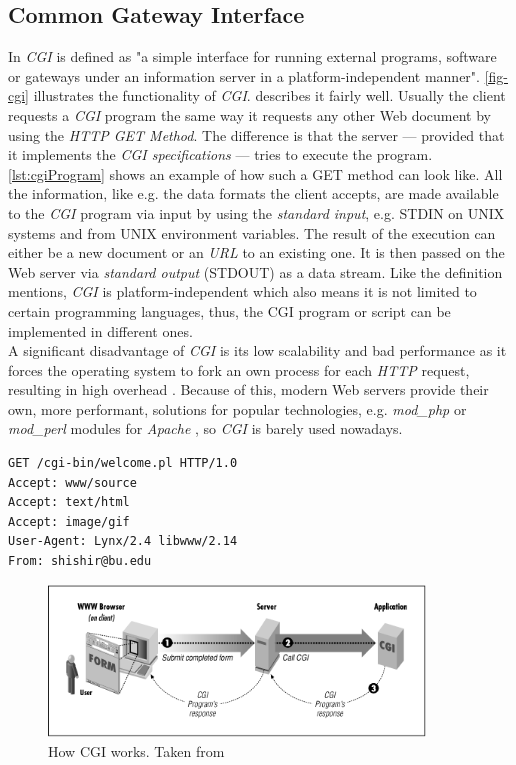 \documentclass[
  a4paper,               %
  twoside,               %
  headings=small,        %
  DIV=12,                %
  BCOR=1cm,              %
  headinclude=true,      %
  footinclude=true,      %
  numbers=noenddot,      %
  11pt]{scrartcl}        %
\begin{document}
\subsection{Common Gateway Interface}
In \cite{cgiSpecs} \textit{CGI} is defined as "a simple interface for running external programs, software or gateways under an information server in a platform-independent manner". \autoref{fig-cgi} illustrates the functionality of \textit{CGI}.\cite{gundavaram1996cgi} describes it fairly well. Usually the client requests a \textit{CGI} program the same way it requests any other Web document by using the \textit{HTTP GET Method}. The difference is that the server --- provided that it implements the \textit{CGI specifications} --- tries to execute the program.  \autoref{lst:cgiProgram} shows an example of how such a GET method can look like. All the information, like e.g. the data formats the client accepts, are made available to the \textit{CGI} program via input by using the \textit{standard input}, e.g. STDIN on UNIX systems and from UNIX environment variables. The result of the execution can either be a new document or an \textit{URL} to an existing one. It is then passed on the Web server via \textit{standard output} (STDOUT) as a data stream. Like the definition mentions, \textit{CGI} is platform-independent which also means it is not limited to certain programming languages, thus, the CGI program or script can be implemented in different ones.\\
A significant disadvantage of \textit{CGI} is its low scalability and bad performance as it forces the operating system to fork an own process for each \textit{HTTP} request, resulting in high overhead \cite{brittain2007tomcat}. Because of this, modern Web servers provide their own, more performant, solutions for popular technologies, e.g. \textit{mod\_php} or \textit{mod\_perl} modules for \textit{Apache} \cite{welling2008php}, so \textit{CGI} is barely used nowadays. 

\begin{lstlisting}[captionpos=b,caption={Client request for CGI program. Taken from \cite{gundavaram1996cgi}},label=lst:cgiProgram]
GET /cgi-bin/welcome.pl HTTP/1.0
Accept: www/source
Accept: text/html
Accept: image/gif
User-Agent: Lynx/2.4 libwww/2.14
From: shishir@bu.edu
\end{lstlisting}

\begin{figure}[h]
  \centerline{\includegraphics[width=10cm]{pics/cgi.png}}
  \caption{How CGI works. Taken from \cite{gundavaram1996cgi}}
  \label{fig-cgi}
\end{figure}
\end{document}

